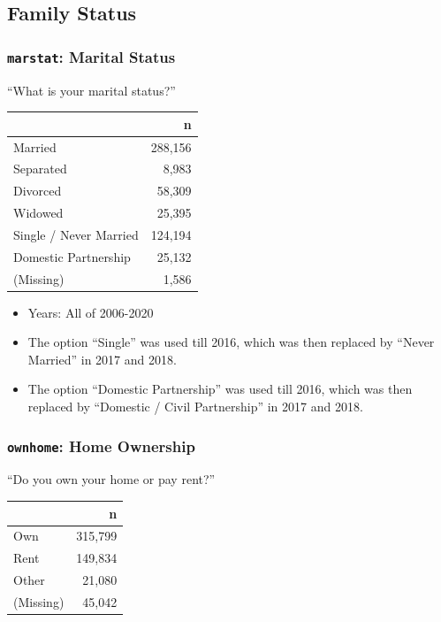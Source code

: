\documentclass[10pt,article,oneside]{memoir}
\theoremstyle{definition}
\begin{document}
\hypertarget{family-status}{%
\subsection{Family Status}\label{family-status}}

\hypertarget{marstat-marital-status}{%
\subsubsection{\texorpdfstring{\texttt{marstat}: Marital
Status}{marstat: Marital Status}}\label{marstat-marital-status}}

``What is your marital status?''

\begin{table}[H]
\centering
\begin{tabular}[t]{lr}
\toprule
 & n\\
\midrule
Married & 288,156\\
Separated & 8,983\\
Divorced & 58,309\\
Widowed & 25,395\\
Single / Never Married & 124,194\\
Domestic Partnership & 25,132\\
(Missing) & 1,586\\
\bottomrule
\end{tabular}
\end{table}

\begin{itemize}
\tightlist
\item
  Years: All of 2006-2020
\item
  The option ``Single'' was used till 2016, which was then replaced by
  ``Never Married'' in 2017 and 2018.
\item
  The option ``Domestic Partnership'' was used till 2016, which was then
  replaced by ``Domestic / Civil Partnership'' in 2017 and 2018.
\end{itemize}

\hypertarget{ownhome-home-ownership}{%
\subsubsection{\texorpdfstring{\texttt{ownhome}: Home
Ownership}{ownhome: Home Ownership}}\label{ownhome-home-ownership}}

``Do you own your home or pay rent?''

\begin{table}[H]
\centering
\begin{tabular}[t]{lr}
\toprule
 & n\\
\midrule
Own & 315,799\\
Rent & 149,834\\
Other & 21,080\\
(Missing) & 45,042\\
\bottomrule
\end{tabular}
\end{table}
\end{document}
